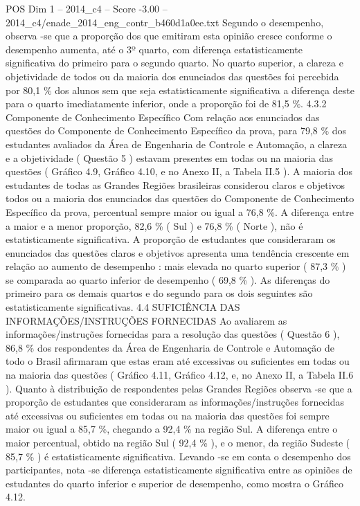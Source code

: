 \begin{textsample}{POS Dim 1 – 2014\_c4 – Score -3.00 – 2014\_c4/enade\_2014\_eng\_contr\_b460d1a0ee.txt}
Segundo o desempenho, observa -se que a proporção dos que emitiram esta opinião cresce conforme o desempenho aumenta, até o 3º quarto, com diferença estatisticamente significativa do primeiro para o segundo quarto.
No quarto superior, a clareza e objetividade de todos ou da maioria dos enunciados das questões foi percebida por 80,1 \% dos alunos sem que seja estatisticamente significativa a diferença deste para o quarto imediatamente inferior, onde a proporção foi de 81,5 \%. 4.3.2 Componente de Conhecimento Específico Com relação aos enunciados das questões do Componente de Conhecimento Específico da prova, para 79,8 \% dos estudantes avaliados da Área de Engenharia de Controle e Automação, a clareza e a objetividade ( Questão 5 ) estavam presentes em todas ou na maioria das questões ( Gráfico 4.9, Gráfico 4.10, e no Anexo II, a Tabela II.5 ).
A maioria dos estudantes de todas as Grandes Regiões brasileiras considerou claros e objetivos todos ou a maioria dos enunciados das questões do Componente de Conhecimento Específico da prova, percentual sempre maior ou igual a 76,8 \%.
A diferença entre a maior e a menor proporção, 82,6 \% ( Sul ) e 76,8 \% ( Norte ), não é estatisticamente significativa.
A proporção de estudantes que consideraram os enunciados das questões claros e objetivos apresenta uma tendência crescente em relação ao aumento de desempenho : mais elevada no quarto superior ( 87,3 \% ) se comparada ao quarto inferior de desempenho ( 69,8 \% ).
As diferenças do primeiro para os demais quartos e do segundo para os dois seguintes são estatisticamente significativas. 4.4 SUFICIÊNCIA DAS INFORMAÇÕES/INSTRUÇÕES FORNECIDAS Ao avaliarem as informações/instruções fornecidas para a resolução das questões ( Questão 6 ), 86,8 \% dos respondentes da Área de Engenharia de Controle e Automação de todo o Brasil afirmaram que estas eram até excessivas ou suficientes em todas ou na maioria das questões ( Gráfico 4.11, Gráfico 4.12, e, no Anexo II, a Tabela II.6 ).
Quanto à distribuição de respondentes pelas Grandes Regiões observa -se que a proporção de estudantes que consideraram as informações/instruções fornecidas até excessivas ou suficientes em todas ou na maioria das questões foi sempre maior ou igual a 85,7 \%, chegando a 92,4 \% na região Sul.
A diferença entre o maior percentual, obtido na região Sul ( 92,4 \% ), e o menor, da região Sudeste ( 85,7 \% ) é estatisticamente significativa.
Levando -se em conta o desempenho dos participantes, nota -se diferença estatisticamente significativa entre as opiniões de estudantes do quarto inferior e superior de desempenho, como mostra o Gráfico 4.12.

\end{textsample}
